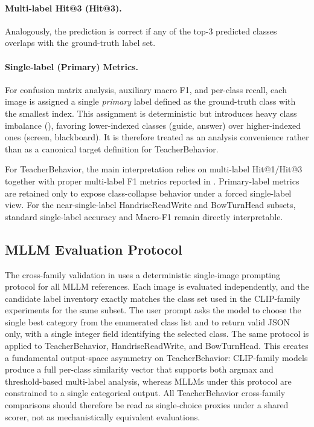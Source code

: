 \documentclass[symmetry,article,submit,pdftex,moreauthors]{Definitions/mdpi}
\begin{document}
\paragraph{Multi-label Hit@3 (Hit@3).}
Analogously, the prediction is correct if any of the top-3 predicted classes overlaps with the ground-truth label set.

\paragraph{Single-label (Primary) Metrics.}
For confusion matrix analysis, auxiliary macro F1, and per-class recall, each image is assigned a single \emph{primary} label defined as the ground-truth class with the smallest index.
This assignment is deterministic but introduces heavy class imbalance (), favoring lower-indexed classes (guide, answer) over higher-indexed ones (screen, blackboard). It is therefore treated as an analysis convenience rather than as a canonical target definition for TeacherBehavior.

For TeacherBehavior, the main interpretation relies on multi-label Hit@1/Hit@3 together with proper multi-label F1 metrics reported in . Primary-label metrics are retained only to expose class-collapse behavior under a forced single-label view. For the near-single-label HandriseReadWrite and BowTurnHead subsets, standard single-label accuracy and Macro-F1 remain directly interpretable.

\subsection{MLLM Evaluation Protocol}
\label{sec:mllm_protocol}

The cross-family validation in  uses a deterministic single-image prompting protocol for all MLLM references. Each image is evaluated independently, and the candidate label inventory exactly matches the class set used in the CLIP-family experiments for the same subset. The user prompt asks the model to choose the single best category from the enumerated class list and to return valid JSON only, with a single integer field identifying the selected class. The same protocol is applied to TeacherBehavior, HandriseReadWrite, and BowTurnHead. This creates a fundamental output-space asymmetry on TeacherBehavior: CLIP-family models produce a full per-class similarity vector that supports both argmax and threshold-based multi-label analysis, whereas MLLMs under this protocol are constrained to a single categorical output. All TeacherBehavior cross-family comparisons should therefore be read as single-choice proxies under a shared scorer, not as mechanistically equivalent evaluations.
\end{document}
